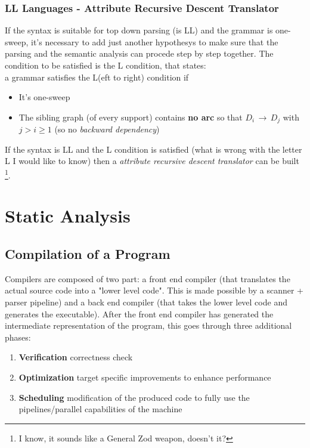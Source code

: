 		\subsubsection{LL Languages - Attribute Recursive Descent Translator}
			If the syntax is suitable for top down parsing (is LL) and the grammar is one-sweep, it's necessary to add just another hypothesys to make sure that the 
			parsing and the semantic analysis can procede step by step together. The condition to be satisfied is the L condition, that states:\\
			a grammar satisfies the L(eft to right) condition if
			\begin{itemize}
				\item It's one-sweep
				\item The sibling graph (of every support) contains \textbf{no arc} so that $D_i \,\rightarrow\, D_j$ with $j > i \geq 1$ (so no 
				\emph{backward dependency})
			\end{itemize}
			If the syntax is LL and the L condition is satisfied (what is wrong with the letter L I would like to know) then a 
			\emph{attribute recursive descent translator} can be built \footnote{I know, it sounds like a General Zod weapon, doesn't it?}.

    \section{Static Analysis}
            \subsection{Compilation of a Program}
                Compilers are composed of two part: a front end compiler (that translates the actual source code into a "lower level code". This is made possible by 
				a scanner + parser pipeline) and a back end compiler (that takes the lower level code and generates the executable). After the front end compiler has 
				generated the intermediate representation of the program, this goes through three additional phases:
                \begin{enumerate}
                    \item \textbf{Verification} correctness check
                    \item \textbf{Optimization} target specific improvements to enhance performance
                    \item \textbf{Scheduling} modification of the produced code to fully use the pipelines/parallel capabilities of the machine
                \end{enumerate}
                
